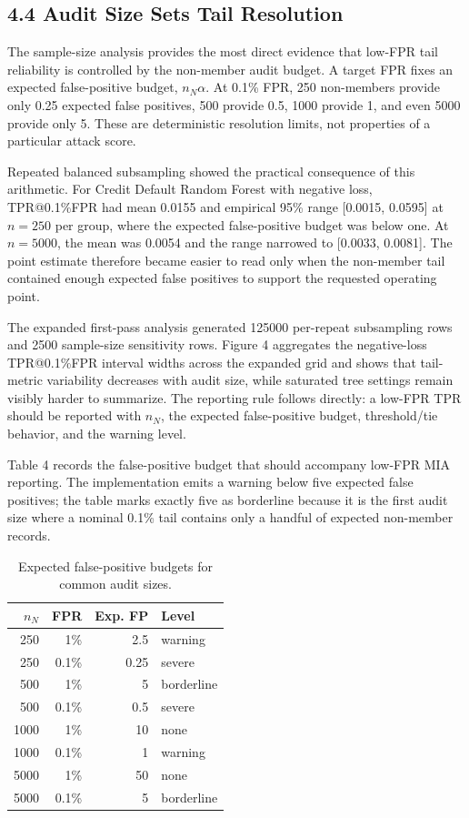\documentclass[
  10pt,
  twocolumn]{article}
\begin{document}
\hypertarget{audit-size-sets-tail-resolution}{%
\subsection{4.4 Audit Size Sets Tail Resolution}\label{audit-size-sets-tail-resolution}}

The sample-size analysis provides the most direct evidence that low-FPR tail reliability is controlled by the non-member audit budget. A target FPR fixes an expected false-positive budget, \(n_N\alpha\). At 0.1\% FPR, 250 non-members provide only 0.25 expected false positives, 500 provide 0.5, 1000 provide 1, and even 5000 provide only 5. These are deterministic resolution limits, not properties of a particular attack score.

Repeated balanced subsampling showed the practical consequence of this arithmetic. For Credit Default Random Forest with negative loss, TPR@0.1\%FPR had mean 0.0155 and empirical 95\% range {[}0.0015, 0.0595{]} at \(n=250\) per group, where the expected false-positive budget was below one. At \(n=5000\), the mean was 0.0054 and the range narrowed to {[}0.0033, 0.0081{]}. The point estimate therefore became easier to read only when the non-member tail contained enough expected false positives to support the requested operating point.

The expanded first-pass analysis generated 125000 per-repeat subsampling rows and 2500 sample-size sensitivity rows. Figure 4 aggregates the negative-loss TPR@0.1\%FPR interval widths across the expanded grid and shows that tail-metric variability decreases with audit size, while saturated tree settings remain visibly harder to summarize. The reporting rule follows directly: a low-FPR TPR should be reported with \(n_N\), the expected false-positive budget, threshold/tie behavior, and the warning level.

Table 4 records the false-positive budget that should accompany low-FPR MIA reporting. The implementation emits a warning below five expected false positives; the table marks exactly five as borderline because it is the first audit size where a nominal 0.1\% tail contains only a handful of expected non-member records.

\begin{table}[t]
\centering
\scriptsize
\caption{Expected false-positive budgets for common audit sizes.}
\label{tab:fp-budget}
\setlength{\tabcolsep}{3pt}
\begin{tabular}{r r r l}
\toprule
$n_N$ & FPR & Exp. FP & Level \\
\midrule
250 & 1\% & 2.5 & warning \\
250 & 0.1\% & 0.25 & severe \\
500 & 1\% & 5 & borderline \\
500 & 0.1\% & 0.5 & severe \\
1000 & 1\% & 10 & none \\
1000 & 0.1\% & 1 & warning \\
5000 & 1\% & 50 & none \\
5000 & 0.1\% & 5 & borderline \\
\bottomrule
\end{tabular}
\end{table}
\end{document}

